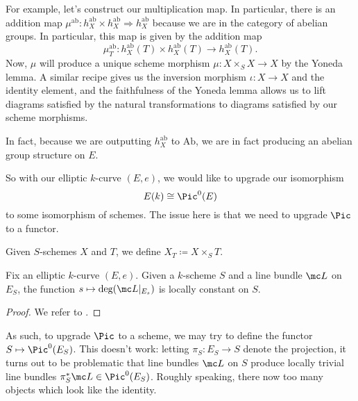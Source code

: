 \documentclass[../notes.tex]{subfiles}
\begin{document}
For example, let's construct our multiplication map. In particular, there is an addition map $\mu^{\mathrm{ab}}\colon h_X^{\mathrm{ab}}\times h_X^{\mathrm{ab}}\Rightarrow h_X^{\mathrm{ab}}$ because we are in the category of abelian groups. In particular, this map is given by the addition map
\[\mu_T^{\mathrm{ab}}\colon h_X^{\mathrm{ab}}(T)\times h_X^{\mathrm{ab}}(T)\to h_X^{\mathrm{ab}}(T).\]
Now, $\mu$ will produce a unique scheme morphism $\mu\colon X\times_SX\to X$ by the Yoneda lemma. A similar recipe gives us the inversion morphism $\iota\colon X\to X$ and the identity element, and the faithfulness of the Yoneda lemma allows us to lift diagrams satisfied by the natural transformations to diagrams satisfied by our scheme morphisms.
\begin{remark}
	In fact, because we are outputting $h_X^{\mathrm{ab}}$ to $\mathrm{Ab}$, we are in fact producing an abelian group structure on $E$.
\end{remark}

So with our elliptic $k$-curve $(E,e)$, we would like to upgrade our isomorphism
\[E(k)\cong\Pic^0(E)\]
to some isomorphism of schemes. The issue here is that we need to upgrade $\Pic$ to a functor.
\begin{notation}
	Given $S$-schemes $X$ and $T$, we define $X_T\coloneqq X\times_ST$.
\end{notation}
\begin{lemma}
	Fix an elliptic $k$-curve $(E,e)$. Given a $k$-scheme $S$ and a line bundle $\mc L$ on $E_S$, the function $s\mapsto\deg(\mc L|_{E_s})$ is locally constant on $S$.
\end{lemma}
\begin{proof}
	We refer to \cite[Theorem~III.9.9]{hartshorne}.
\end{proof}
As such, to upgrade $\Pic$ to a scheme, we may try to define the functor $S\mapsto\Pic^0(E_S)$. This doesn't work: letting $\pi_S\colon E_S\to S$ denote the projection, it turns out to be problematic that line bundles $\mc L$ on $S$ produce locally trivial line bundles $\pi_S^*\mc L\in\Pic^0(E_S)$. Roughly speaking, there now too many objects which look like the identity.
\end{document}
